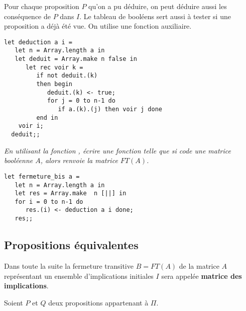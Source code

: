 \begin{Answer}
Pour chaque proposition $P$ qu'on a pu déduire, on peut déduire aussi les conséquence de $P$ dans $I$. Le tableau de booléens sert aussi à tester si une proposition a déjà été vue. On utilise une fonction auxiliaire.
\begin{lstlisting}
let deduction a i =
   let n = Array.length a in
   let deduit = Array.make n false in
      let rec voir k = 
         if not deduit.(k)
         then begin
            deduit.(k) <- true;
            for j = 0 to n-1 do
               if a.(k).(j) then voir j done
         end in
    voir i;
  deduit;;    
\end{lstlisting}
\end{Answer}
\begin{Exercise}\it
En utilisant la fonction , écrire une fonction  telle que si  code une matrice booléenne $A$, alors  renvoie la matrice  $FT(A)$.
\end{Exercise}
\begin{Answer}
\begin{lstlisting}
let fermeture_bis a =
   let n = Array.length a in
   let res = Array.make  n [||] in
   for i = 0 to n-1 do
      res.(i) <- deduction a i done;
   res;;    
\end{lstlisting}
\end{Answer}
\newpage
\subsection{Propositions équivalentes}
Dans toute la suite la fermeture transitive $B = FT(A)$ de la matrice $A$ représentant un ensemble d'implications initiales $I$ sera appelée {\bf matrice des implications}.

Soient $P$ et $Q$ deux propositions appartenant à $\Pi$.

